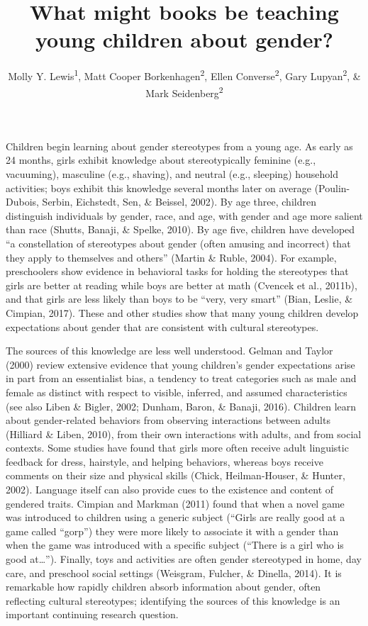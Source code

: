 \documentclass[english,,man,floatsintext]{apa6}
\title{What might books be teaching young children about gender?}
\author{Molly Y. Lewis\textsuperscript{1}, Matt Cooper Borkenhagen\textsuperscript{2}, Ellen Converse\textsuperscript{2}, Gary Lupyan\textsuperscript{2}, \& Mark Seidenberg\textsuperscript{2}}
\date{}
\affiliation{
\vspace{0.5cm}
\textsuperscript{1} Department of Psychology, Carnegie Mellon University\\\textsuperscript{2} Department of Psychology, University of Wisconsin, Madison}
\begin{document}
\maketitle

Children begin learning about gender stereotypes from a young age. As early as 24 months, girls exhibit knowledge about stereotypically feminine (e.g., vacuuming), masculine (e.g., shaving), and neutral (e.g., sleeping) household activities; boys exhibit this knowledge several months later on average (Poulin-Dubois, Serbin, Eichstedt, Sen, \& Beissel, 2002). By age three, children distinguish individuals by gender, race, and age, with gender and age more salient than race (Shutts, Banaji, \& Spelke, 2010). By age five, children have developed \enquote{a constellation of stereotypes about gender (often amusing and incorrect) that they apply to themselves and others} (Martin \& Ruble, 2004). For example, preschoolers show evidence in behavioral tasks for holding the stereotypes that girls are better at reading while boys are better at math (Cvencek et al., 2011b), and that girls are less likely than boys to be \enquote{very, very smart} (Bian, Leslie, \& Cimpian, 2017). These and other studies show that many young children develop expectations about gender that are consistent with cultural stereotypes.

The sources of this knowledge are less well understood. Gelman and Taylor (2000) review extensive evidence that young children's gender expectations arise in part from an essentialist bias, a tendency to treat categories such as male and female as distinct with respect to visible, inferred, and assumed characteristics (see also Liben \& Bigler, 2002; Dunham, Baron, \& Banaji, 2016). Children learn about gender-related behaviors from observing interactions between adults (Hilliard \& Liben, 2010), from their own interactions with adults, and from social contexts. Some studies have found that girls more often receive adult linguistic feedback for dress, hairstyle, and helping behaviors, whereas boys receive comments on their size and physical skills (Chick, Heilman-Houser, \& Hunter, 2002). Language itself can also provide cues to the existence and content of gendered traits. Cimpian and Markman (2011) found that when a novel game was introduced to children using a generic subject (\enquote{Girls are really good at a game called ``gorp}) they were more likely to associate it with a gender than when the game was introduced with a specific subject (\enquote{There is a girl who is good at\ldots{}}). Finally, toys and activities are often gender stereotyped in home, day care, and preschool social settings (Weisgram, Fulcher, \& Dinella, 2014). It is remarkable how rapidly children absorb information about gender, often reflecting cultural stereotypes; identifying the sources of this knowledge is an important continuing research question.
\end{document}
